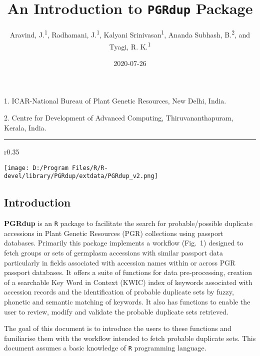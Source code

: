 \documentclass[
]{article}
\title{An Introduction to \texttt{PGRdup} Package}
\author{Aravind, J.\textsuperscript{1}, Radhamani, J.\textsuperscript{1},
Kalyani Srinivasan\textsuperscript{1}, Ananda Subhash,
B.\textsuperscript{2}, and Tyagi, R. K.\textsuperscript{1}}
\date{2020-07-26}
\begin{document}
\maketitle

\begin{center}
1. ICAR-National Bureau of Plant Genetic Resources, New Delhi, India.

2. Centre for Development of Advanced Computing, Thiruvananthapuram, Kerala, India.

\end{center}

\begin{center}
\vspace{6pt}
\hrule
\end{center}

\tableofcontents

\begin{wrapfigure}{r}{0.35\textwidth}
  \vspace{1cm}
  \begin{center}
    \texttt{[image: D:/Program Files/R/R-devel/library/PGRdup/extdata/PGRdup\_v2.png]}
  \end{center}
  \vspace{-1.5cm}
\end{wrapfigure}\leavevmode

\hypertarget{introduction}{%
\subsection{Introduction}\label{introduction}}

\textbf{PGRdup} is an \texttt{R} package to facilitate the search for
probable/possible duplicate accessions in Plant Genetic Resources (PGR)
collections using passport databases. Primarily this package implements
a workflow (Fig.~1) designed to fetch groups or sets of germplasm
accessions with similar passport data particularly in fields associated
with accession names within or across PGR passport databases. It offers
a suite of functions for data pre-processing, creation of a searchable
Key Word in Context (KWIC) index of keywords associated with accession
records and the identification of probable duplicate sets by fuzzy,
phonetic and semantic matching of keywords. It also has functions to
enable the user to review, modify and validate the probable duplicate
sets retrieved.

The goal of this document is to introduce the users to these functions
and familiarise them with the workflow intended to fetch probable
duplicate sets. This document assumes a basic knowledge of \texttt{R}
programming language.
\end{document}
